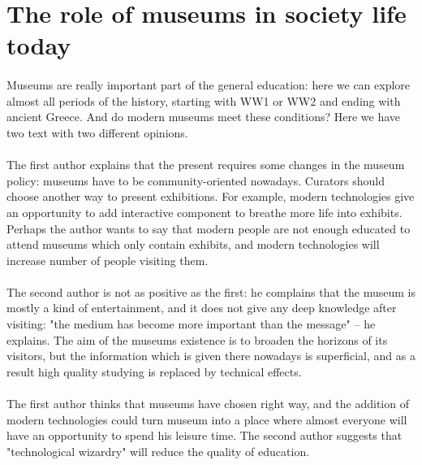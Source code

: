 \documentclass[14pt]{article}
\begin{document}
\large

\section*{The role of museums in society life today}
\paragraph{}
Museums are really important part of the general education: here we can explore 
almost all periods of the history, starting with WW1 or WW2 and ending with ancient Greece.
And do modern museums meet these conditions? Here we have two text with two different opinions.
\paragraph{}
The first author explains that the present requires some changes in the museum policy: museums 
have to be community-oriented nowadays. Curators should choose another way to present exhibitions.
For example, modern technologies give an opportunity to add interactive component to breathe more life into exhibits.
 Perhaps the author wants to say that modern people are not enough educated to attend museums which only 
contain exhibits, and modern technologies will increase number of people visiting them.
\paragraph{}
The second author is not as positive as the first: he complains that the museum is mostly a kind of
entertainment, and it does not give any deep knowledge after visiting: "the medium has become more important
 than the message" -- he explains. The aim of the museums existence is to broaden the horizons of
its visitors, but the information which is given there nowadays is superficial, and as a result high quality studying
is replaced by technical effects.
\paragraph{}
The first author thinks that museums have chosen right way, and the addition of modern technologies could
turn museum into a place where almost everyone will have an opportunity to spend his leisure time.
The second author suggests that "technological wizardry" will reduce the quality of education.
\end{document}
